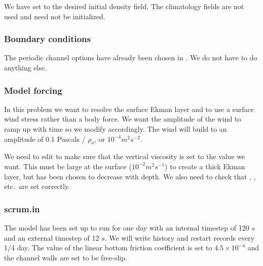 We have set  to the desired initial density field.
The climatology fields are not used and need not be initialized.

\subsubsection{Boundary conditions}
The periodic channel options have already been chosen in
.  We do not have to do anything else.

\subsubsection{Model forcing}
In this problem we want to resolve the
surface Ekman layer and to use a surface wind stress rather than a body
force.  We want the amplitude of the wind to ramp up with time so we
modify  accordingly.
The wind will build to an amplitude of 0.1 Pascals / $\rho_o$,
or $10^{-4} m^2 s^{-2}$.

We need to edit  to make sure that the
vertical viscosity  is set to the value we want.  This
must be large at the surface ($10^{-2} m^2 s^{-1}$) to create a thick
Ekman layer, but has been chosen to decrease with depth.  We also need
to check that , , etc.\ are
set correctly.

\subsubsection{scrum.in}
The model has been set up to run for one day with an internal timestep
of 120 $s$ and an external timestep of 12 $s$.  We will write history
and restart records every 1/4 day.  The value of the linear bottom
friction coefficient  is set to $4.5 \times 10^{-4}$ and the
channel walls are set to be free-slip.

